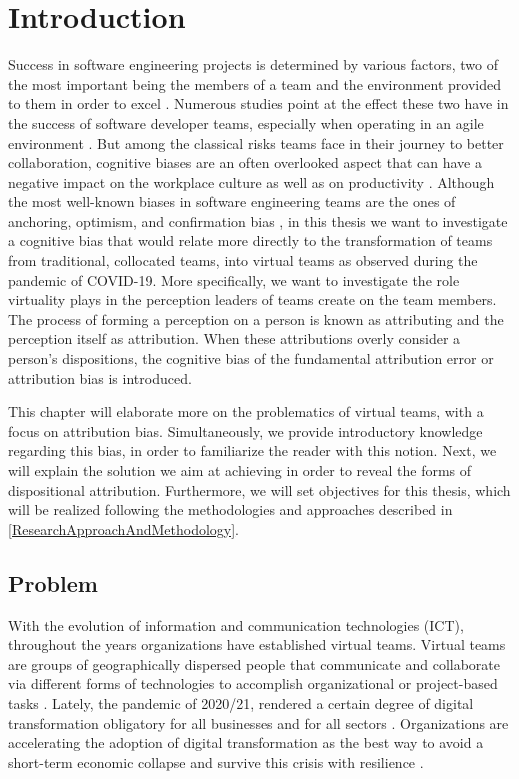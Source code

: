 \chapter{Introduction} \label{Introduction}

Success in software engineering projects is determined by various factors,  two of the most important being the members of a team and the environment provided to them in order to excel \cite{Reel1999}. Numerous studies point at the effect these two have in the success of software developer teams, especially when operating in an agile environment \cite{Lindsjorn2016} \cite{Chow2008}. But among the classical risks teams face in their journey to better collaboration, cognitive biases are an often overlooked aspect that can have a negative impact on the workplace culture as well as on productivity \cite{Chattopadhyay2020}. Although the most well-known biases in software engineering teams are the ones of anchoring, optimism, and confirmation bias \cite{Mohanai2018}, in this thesis we want to investigate a cognitive bias that would relate more directly to the transformation of teams from traditional, collocated teams, into virtual teams as observed during the pandemic of COVID-19. More specifically, we want to investigate the role virtuality plays in the perception leaders of teams create on the team members.  The process of forming a perception on a person  is known as attributing and the perception itself as attribution.  When these attributions overly consider a person's dispositions,  the cognitive bias of the fundamental attribution error or attribution bias is introduced.  

This chapter will elaborate more on the problematics of virtual teams,  with a focus on attribution bias. Simultaneously, we provide introductory knowledge regarding this bias, in order to familiarize the reader with this notion. Next, we will explain the solution we aim at achieving in order to reveal the forms of dispositional attribution. Furthermore, we will set objectives for this thesis, which will be realized following the methodologies and approaches described in \ref{ResearchApproachAndMethodology}.

\section{Problem}

With the evolution of information and communication technologies (ICT),  throughout the years organizations have established virtual teams. Virtual teams are groups of geographically dispersed people that communicate and collaborate via different forms of technologies to accomplish organizational or project-based tasks \cite{Townsed1998}. Lately, the pandemic of 2020/21, rendered a certain degree of digital transformation obligatory for all businesses and for all sectors \cite{Fletcher2020}. Organizations are accelerating the adoption of digital transformation as the best way to avoid a short-term economic collapse and survive this crisis with resilience \cite{Pedro2020}. 

